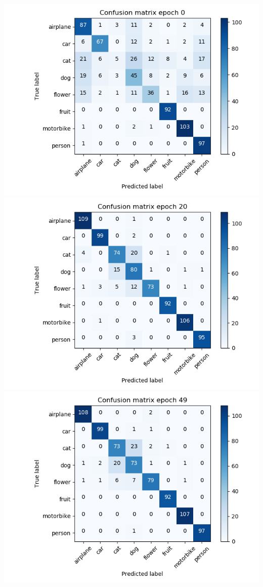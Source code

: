 \documentclass{article}
\begin{document}
\begin{minipage}[c]{\linewidth}
	\includegraphics[width=\figureWidth\textwidth]{./figures/cm_h64_w64_r_smote_e0.png}
	\includegraphics[width=\figureWidth\textwidth]{./figures/cm_h64_w64_r_smote_e20.png}
	\includegraphics[width=\figureWidth\textwidth]{./figures/cm_h64_w64_r_smote_e49.png}
	

\end{minipage}
\end{document}
